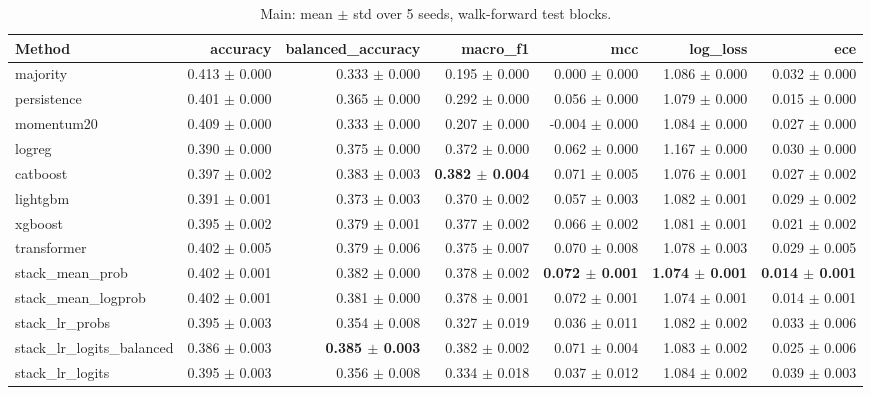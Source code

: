 \begin{table}[t]
\centering
\scriptsize
\caption{Main: mean $\pm$ std over 5 seeds, walk-forward test blocks.}
\label{tab:main}
\begin{tabular}{lrrrrrr}
\toprule
Method & accuracy & balanced\_accuracy & macro\_f1 & mcc & log\_loss & ece \\
\midrule
majority & 0.413 $\pm$ 0.000 & 0.333 $\pm$ 0.000 & 0.195 $\pm$ 0.000 & 0.000 $\pm$ 0.000 & 1.086 $\pm$ 0.000 & 0.032 $\pm$ 0.000 \\
persistence & 0.401 $\pm$ 0.000 & 0.365 $\pm$ 0.000 & 0.292 $\pm$ 0.000 & 0.056 $\pm$ 0.000 & 1.079 $\pm$ 0.000 & 0.015 $\pm$ 0.000 \\
momentum20 & 0.409 $\pm$ 0.000 & 0.333 $\pm$ 0.000 & 0.207 $\pm$ 0.000 & -0.004 $\pm$ 0.000 & 1.084 $\pm$ 0.000 & 0.027 $\pm$ 0.000 \\
logreg & 0.390 $\pm$ 0.000 & 0.375 $\pm$ 0.000 & 0.372 $\pm$ 0.000 & 0.062 $\pm$ 0.000 & 1.167 $\pm$ 0.000 & 0.030 $\pm$ 0.000 \\
catboost & 0.397 $\pm$ 0.002 & 0.383 $\pm$ 0.003 & \textbf{0.382 $\pm$ 0.004} & 0.071 $\pm$ 0.005 & 1.076 $\pm$ 0.001 & 0.027 $\pm$ 0.002 \\
lightgbm & 0.391 $\pm$ 0.001 & 0.373 $\pm$ 0.003 & 0.370 $\pm$ 0.002 & 0.057 $\pm$ 0.003 & 1.082 $\pm$ 0.001 & 0.029 $\pm$ 0.002 \\
xgboost & 0.395 $\pm$ 0.002 & 0.379 $\pm$ 0.001 & 0.377 $\pm$ 0.002 & 0.066 $\pm$ 0.002 & 1.081 $\pm$ 0.001 & 0.021 $\pm$ 0.002 \\
transformer & 0.402 $\pm$ 0.005 & 0.379 $\pm$ 0.006 & 0.375 $\pm$ 0.007 & 0.070 $\pm$ 0.008 & 1.078 $\pm$ 0.003 & 0.029 $\pm$ 0.005 \\
stack\_mean\_prob & 0.402 $\pm$ 0.001 & 0.382 $\pm$ 0.000 & 0.378 $\pm$ 0.002 & \textbf{0.072 $\pm$ 0.001} & \textbf{1.074 $\pm$ 0.001} & \textbf{0.014 $\pm$ 0.001} \\
stack\_mean\_logprob & 0.402 $\pm$ 0.001 & 0.381 $\pm$ 0.000 & 0.378 $\pm$ 0.001 & 0.072 $\pm$ 0.001 & 1.074 $\pm$ 0.001 & 0.014 $\pm$ 0.001 \\
stack\_lr\_probs & 0.395 $\pm$ 0.003 & 0.354 $\pm$ 0.008 & 0.327 $\pm$ 0.019 & 0.036 $\pm$ 0.011 & 1.082 $\pm$ 0.002 & 0.033 $\pm$ 0.006 \\
stack\_lr\_logits\_balanced & 0.386 $\pm$ 0.003 & \textbf{0.385 $\pm$ 0.003} & 0.382 $\pm$ 0.002 & 0.071 $\pm$ 0.004 & 1.083 $\pm$ 0.002 & 0.025 $\pm$ 0.006 \\
stack\_lr\_logits & 0.395 $\pm$ 0.003 & 0.356 $\pm$ 0.008 & 0.334 $\pm$ 0.018 & 0.037 $\pm$ 0.012 & 1.084 $\pm$ 0.002 & 0.039 $\pm$ 0.003 \\
\bottomrule
\end{tabular}
\end{table}